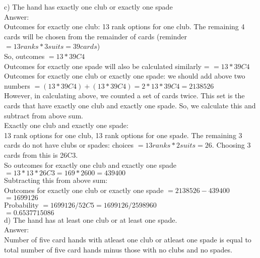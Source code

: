 \documentclass[14pt]{extreport}
\begin{document}
\begin{enumerate}[label=(\alph*)]
c) The hand has exactly one club or exactly one spade\\

Answer:\\

Outcomes for exactly one club: 13 rank options for one club. The remaining 4 cards will be chosen from the remainder of cards (reminder $= 13 ranks * 3 suits = 39 cards$) \\
So, outcomes $ = 13 * 39C4 $ \\
Outcomes for exactly one spade will also be calculated similarly = $ = 13 * 39C4 $ \\

Outcomes for exactly one club or exactly one spade: we should add above two numbers $ = (13 * 39C4) + (13 * 39C4) = 2 * 13 * 39C4 = 2138526 $\\

However, in calculating above, we counted a set of cards twice. This set is the cards that have exactly one club and exactly one spade. So, we calculate this and subtract from above sum. \\

Exactly one club and exactly one spade:\\
13 rank options for one club, 13 rank options for one spade. The remaining 3 cards do not have clubs or spades: choices $ = 13 ranks * 2 suits = 26 $. Choosing 3 cards from this is 26C3. \\
So outcomes for exactly one club and exactly one spade $ = 13 * 13 * 26C3  = 169 * 2600 = 439400 $ \\

Subtracting this from above sum:\\
Outcomes for exactly one club or exactly one spade $ = 2138526 - 439400 $ \\
 $ = 1699126 $ \\

Probability $ = 1699126 / 52C5 = 1699126 / 2598960 $ \\
 $= 0.6537715086 $ \\

\newpage
d) The hand has at least one club or at least one spade.\\

Answer: \\
Number of five card hands with atleast one club or atleast one spade is equal to total number of five card hands minus those with no clubs and no spades. \\


\end{enumerate}
\end{document}
